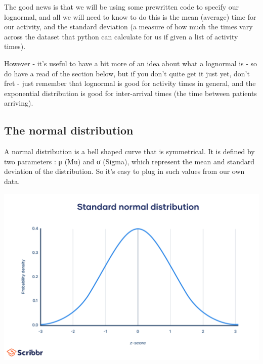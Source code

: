 \documentclass[
  letterpaper,
  DIV=11,
  numbers=noendperiod]{scrreprt}
\begin{document}
\begin{tcolorbox}[enhanced jigsaw, colframe=quarto-callout-tip-color-frame, bottomtitle=1mm, breakable, rightrule=.15mm, coltitle=black, colbacktitle=quarto-callout-tip-color!10!white, opacityback=0, leftrule=.75mm, arc=.35mm, toptitle=1mm, title=\textcolor{quarto-callout-tip-color}{\faLightbulb}\hspace{0.5em}{Tip}, titlerule=0mm, colback=white, toprule=.15mm, bottomrule=.15mm, left=2mm, opacitybacktitle=0.6]

The good news is that we will be using some prewritten code to specify
our lognormal, and all we will need to know to do this is the mean
(average) time for our activity, and the standard deviation (a measure
of how much the times vary across the dataset that python can calculate
for us if given a list of activity times).

However - it's useful to have a bit more of an idea about what a
lognormal is - so do have a read of the section below, but if you don't
quite get it just yet, don't fret - just remember that lognormal is good
for activity times in general, and the exponential distribution is good
for inter-arrival times (the time between patients arriving).

\end{tcolorbox}

\subsection{The normal distribution}\label{the-normal-distribution}

A normal distribution is a bell shaped curve that is symmetrical. It is
defined by two parameters : μ (Mu) and σ (Sigma), which represent the
mean and standard deviation of the distribution. So it's easy to plug in
such values from our own data.

\includegraphics{images/normal_dist.png}
\end{document}
